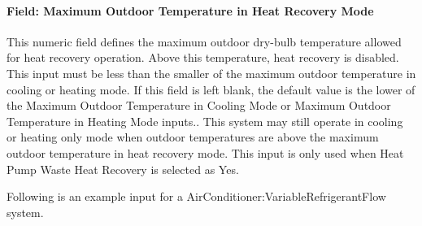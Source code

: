 \paragraph{Field: Maximum Outdoor Temperature in Heat Recovery Mode}\label{field-maximum-outdoor-temperature-in-heat-recovery-mode}

This numeric field defines the maximum outdoor dry-bulb temperature allowed for heat recovery operation. Above this temperature, heat recovery is disabled. This input must be less than the smaller of the maximum outdoor temperature in cooling or heating mode. If this field is left blank, the default value is the lower of the Maximum Outdoor Temperature in Cooling Mode or Maximum Outdoor Temperature in Heating Mode inputs.. This system may still operate in cooling or heating only mode when outdoor temperatures are above the maximum outdoor temperature in heat recovery mode. This input is only used when Heat Pump Waste Heat Recovery is selected as Yes.

Following is an example input for a AirConditioner:VariableRefrigerantFlow system.

